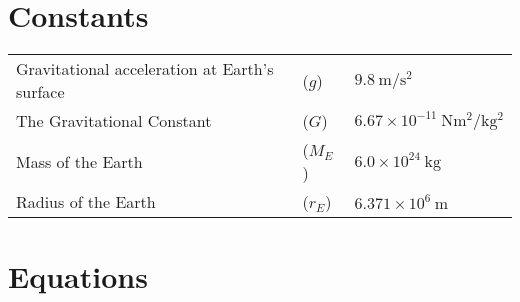 \documentclass[main.tex]{subfiles}
\begin{document}
        \section{Constants}
            \label{sec: Constants Kinematics}

            \begin{table}[!h]
                \noindent\begin{tabular}{@{} p{80mm} C{10mm} p{50mm}}
                    Gravitational acceleration at Earth's surface &($g$) &$9.8\ \si{\metre \per\second\squared}$\\[\tablegap]
                    The Gravitational Constant &($G$) &$6.67 \times 10^{-11}\ \si{\newton \metre\squared \per\kilo\gram\squared}$\\[\tablegap]
                    Mass of the Earth &($M_E$) &$6.0\times 10^{24}\ \si{\kilo\gram}$\\[\tablegap]
                    Radius of the Earth &($r_E$) &$6.371\times 10^{6}\ \si{\metre}$
                \end{tabular}
            \end{table}
            

        \newpage
        \section{Equations}
            \label{sec: Equations Advanced Mechanics}
            
\end{document}
